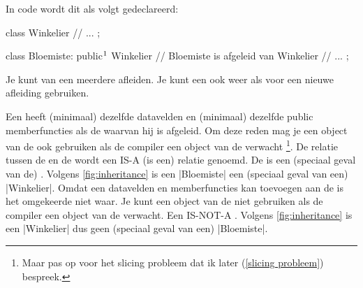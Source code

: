 \begin{cpplstShortInline}
\begin{minipage}{\textwidth}
\begin{minipage}[c]{.64\textwidth}
In \Cpp{} code wordt dit als volgt gedeclareerd:
\begin{cpplstfragment}[mathescape=true]
class Winkelier {
//  ...
};

class Bloemiste: public$\footnotemark$ Winkelier {
//  Bloemiste is afgeleid van Winkelier
//  ...
};
\end{cpplstfragment}
\end{minipage}
\hfill
\begin{minipage}[c]{.34\textwidth}
\vspace{-5ex}
\end{minipage}
\end{minipage}


\vspace{1ex}
Je kunt van een  meerdere  afleiden.
Je kunt een  ook weer als  voor een nieuwe afleiding gebruiken.

Een  heeft (minimaal) dezelfde datavelden en (minimaal) dezelfde public memberfuncties als de  waarvan hij is afgeleid.
Om deze reden mag je een object van de  ook gebruiken als de compiler een object van de  verwacht%
\footnote{%
    Maar pas op voor het slicing probleem dat ik later (\cref{slicing probleem}) bespreek.
}. 
De relatie tussen de  en de  wordt een IS-A (is een) relatie genoemd.
De  is een (speciaal geval van de) .
Volgens \cref{fig:inheritance} is een |Bloemiste| een (speciaal geval van een) |Winkelier|.
Omdat een  datavelden en memberfuncties kan toevoegen aan de  is het omgekeerde niet waar.
Je kunt een object van de  niet gebruiken als de compiler een object van de  verwacht.
Een  IS-NOT-A .
Volgens \cref{fig:inheritance} is een |Winkelier| dus geen (speciaal geval van een) |Bloemiste|.


\end{cpplstShortInline}
